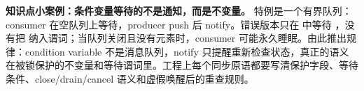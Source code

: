 \begin{casebox}
\textbf{知识点小案例：条件变量等待的不是通知，而是不变量。}
特例是一个有界队列：consumer 在空队列上等待，producer push 后 notify。错误版本只在  中等待 ，没有把  纳入谓词；当队列关闭且没有元素时，consumer 可能永久睡眠。由此推出规律：condition variable 不是消息队列，notify 只提醒重新检查状态，真正的语义在被锁保护的不变量和等待谓词里。工程上每个同步原语都要写清保护字段、等待条件、close/drain/cancel 语义和虚假唤醒后的重查规则。
\end{casebox}
